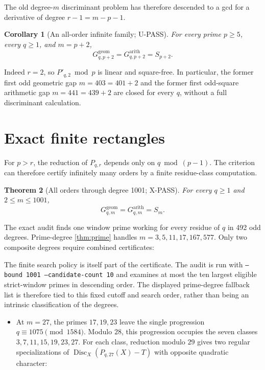 \documentclass[11pt]{article}
\theoremstyle{keio}
\newtheorem{theorem}{Theorem}[section]
\newtheorem{corollary}[theorem]{Corollary}
\theoremstyle{definition}
\theoremstyle{remark}
\newcommand{\UPASS}{\textcolor{keiogreen}{\textsf{U-PASS}}}
\newcommand{\XPASS}{\textcolor{keioxblue}{\textsf{X-PASS}}}
\begin{document}
The old degree-$m$ discriminant problem has therefore descended to a gcd for
a derivative of degree $r-1=m-p-1$.

\begin{corollary}[An all-order infinite family; \UPASS]\label{cor:shifted}
For every prime $p\ge5$, every $q\ge1$, and $m=p+2$,
\begin{equation}
\boxed{G^{\mathrm{geom}}_{q,p+2}=G^{\mathrm{arith}}_{q,p+2}=S_{p+2}.}
\label{eq:shifted}
\end{equation}
\end{corollary}

Indeed $r=2$, so $P'_{q,2}\bmod p$ is linear and square-free. In
particular, the former first odd geometric gap $m=403=401+2$ and the former
first odd-square arithmetic gap $m=441=439+2$ are closed for every $q$,
without a full discriminant calculation.

\section{Exact finite rectangles}

For $p>r$, the reduction of $P_{q,r}$ depends only on $q\bmod(p-1)$. The
criterion can therefore certify infinitely many orders by a finite
residue-class computation.

\begin{theorem}[All orders through degree 1001; \XPASS]\label{thm:1001}
For every $q\ge1$ and $2\le m\le1001$,
\begin{equation}
\boxed{G^{\mathrm{geom}}_{q,m}=G^{\mathrm{arith}}_{q,m}=S_m.}
\label{eq:1001}
\end{equation}
\end{theorem}

The exact audit finds one window prime working for every residue of $q$ in
492 odd degrees. Prime-degree \cref{thm:prime} handles
$m=3,5,11,17,167,577$. Only two composite degrees require combined
certificates:

The finite search policy is itself part of the certificate.  The audit is
run with \texttt{--bound 1001 --candidate-count 10} and examines at most the
ten largest eligible strict-window primes in descending order.  The displayed
prime-degree fallback list is therefore tied to this fixed cutoff and search
order, rather than being an intrinsic classification of the degrees.
\begin{itemize}
\item At $m=27$, the primes $17,19,23$ leave the single progression
$q\equiv1075\pmod{1584}$. Modulo $28$, this progression occupies the seven
classes $3,7,11,15,19,23,27$. For each class, reduction modulo $29$ gives
two regular specializations of
$\operatorname{Disc}_X(P_{q,27}(X)-T)$ with opposite quadratic character:
\end{itemize}
\end{document}
